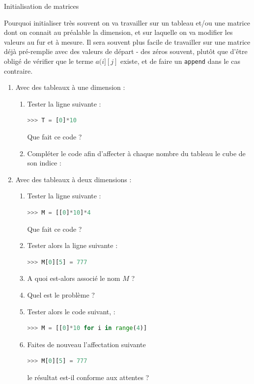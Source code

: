 \documentclass[a4paper,11pt]{article}
\begin{document}
\begin{ExerciceNomme}{Initialisation de matrices}


\begin{info}{Pourquoi initialiser}
très souvent on va travailler sur un tableau et/ou une matrice dont on connait au préalable la dimension, et sur laquelle on va modifier les valeurs au fur et à mesure. Il sera souvent plus facile de travailler sur une matrice déjà pré-remplie avec des valeurs de départ - des zéros souvent, plutôt que d'être obligé de vérifier que le terme $a(i][j]$ existe, et de faire un \texttt{append} dans le cas contraire.
\end{info}
\begin{enumerate}
\item Avec des tableaux à une dimension :
\begin{enumerate}
\item Tester la ligne suivante :
\begin{lstlisting}[language=python, caption = {Initialisation de tableau}]
>>> T = [0]*10
\end{lstlisting}
Que fait ce code ?
\item Compléter le code afin d'affecter à chaque nombre du tableau le cube de son indice :
\end{enumerate}
\item Avec des tableaux à deux dimensions :
\begin{enumerate}
\item Tester la ligne suivante :
\begin{lstlisting}[language=python, caption = {En dimension 2}]
>>> M = [[0]*10]*4
\end{lstlisting}
Que fait ce code ?
\item Tester alors la ligne suivante :
\begin{lstlisting}[language=python, caption = {Affectations 1}]
>>> M[0][5] = 777
\end{lstlisting}
\item A quoi est-alors associé le nom $M$ ? 
\item Quel est le problème ?
\item Tester alors le code suivant, :
\begin{lstlisting}[language=python, caption = {Une bonne initialisation}]
>>> M = [[0]*10 for i in range(4)]
\end{lstlisting}
\item Faites de nouveau l'affectation suivante
\begin{lstlisting}[language=python, caption = {Affectations 1}]
>>> M[0][5] = 777
\end{lstlisting}
le résultat est-il conforme aux attentes ? 
\end{enumerate}
\end{enumerate}
\end{ExerciceNomme}
\end{document}
